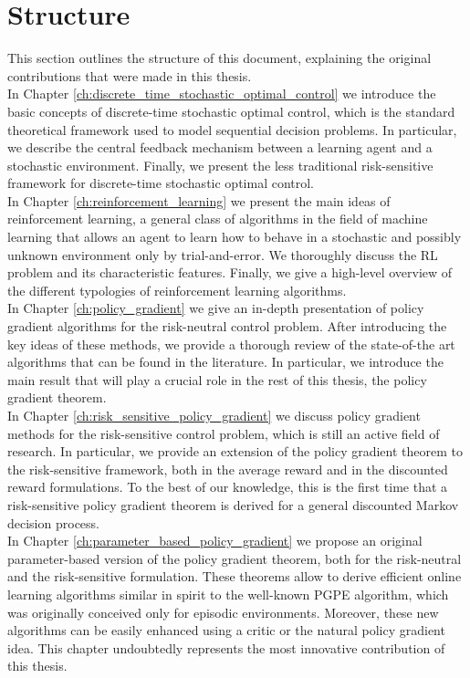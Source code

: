 \section{Structure}
This section outlines the structure of this document, explaining the original contributions that were made in this thesis.\\
In Chapter \ref{ch:discrete_time_stochastic_optimal_control} we introduce the basic concepts of discrete-time stochastic optimal control, which is the standard theoretical framework used to model sequential decision problems. In particular, we describe the central feedback mechanism between a learning agent and a stochastic environment. Finally, we present the less traditional risk-sensitive framework for discrete-time stochastic optimal control.\\
In Chapter \ref{ch:reinforcement_learning} we present the main ideas of reinforcement learning, a general class of algorithms in the field of machine learning that allows an agent to learn how to behave in a stochastic and possibly unknown environment only by trial-and-error. We thoroughly discuss the RL problem and its characteristic features. Finally, we give a high-level overview of the different typologies of reinforcement learning algorithms.\\ 
In Chapter \ref{ch:policy_gradient} we give an in-depth presentation of policy gradient algorithms for the risk-neutral control problem. After introducing the key ideas of these methods, we provide a thorough review of the state-of-the art algorithms that can be found in the literature. In particular, we introduce the main result that will play a crucial role in the rest of this thesis, the policy gradient theorem.\\
In Chapter \ref{ch:risk_sensitive_policy_gradient} we discuss policy gradient methods for the risk-sensitive control problem, which is still an active field of research. In particular, we provide an extension of the policy gradient theorem to the risk-sensitive framework, both in the average reward and in the discounted reward formulations. To the best of our knowledge, this is the first time that a risk-sensitive policy gradient theorem is derived for a general discounted Markov decision process.\\
In Chapter \ref{ch:parameter_based_policy_gradient} we propose an original parameter-based version of the policy gradient theorem, both for the risk-neutral and the risk-sensitive formulation. These theorems allow to derive efficient online learning algorithms similar in spirit to the well-known PGPE algorithm, which was originally conceived only for episodic environments. Moreover, these new algorithms can be easily enhanced using a critic or the natural policy gradient idea. This chapter undoubtedly represents the most innovative contribution of this thesis.\\ 
